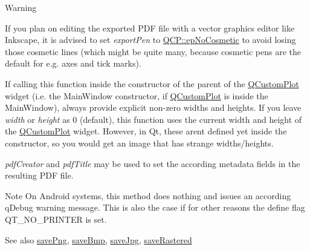 \begin{DoxyWarning}{Warning}
\begin{DoxyItemize}
\item If you plan on editing the exported P\+DF file with a vector graphics editor like Inkscape, it is advised to set {\itshape export\+Pen} to \hyperlink{namespace_q_c_p_a17844f19e1019693a953e1eb93536d2faec51f17ee42178094138e69ac73daa52}{Q\+C\+P\+::ep\+No\+Cosmetic} to avoid losing those cosmetic lines (which might be quite many, because cosmetic pens are the default for e.\+g. axes and tick marks). \item If calling this function inside the constructor of the parent of the \hyperlink{class_q_custom_plot}{Q\+Custom\+Plot} widget (i.\+e. the Main\+Window constructor, if \hyperlink{class_q_custom_plot}{Q\+Custom\+Plot} is inside the Main\+Window), always provide explicit non-\/zero widths and heights. If you leave {\itshape width} or {\itshape height} as 0 (default), this function uses the current width and height of the \hyperlink{class_q_custom_plot}{Q\+Custom\+Plot} widget. However, in Qt, these aren\textquotesingle{}t defined yet inside the constructor, so you would get an image that has strange widths/heights.\end{DoxyItemize}
{\itshape pdf\+Creator} and {\itshape pdf\+Title} may be used to set the according metadata fields in the resulting P\+DF file.
\end{DoxyWarning}
\begin{DoxyNote}{Note}
On Android systems, this method does nothing and issues an according q\+Debug warning message. This is also the case if for other reasons the define flag {\ttfamily Q\+T\+\_\+\+N\+O\+\_\+\+P\+R\+I\+N\+T\+ER} is set.
\end{DoxyNote}
\begin{DoxySeeAlso}{See also}
\hyperlink{class_q_custom_plot_ac92cc9256d12f354b40a4be4600b5fb9}{save\+Png}, \hyperlink{class_q_custom_plot_ae3a86ed0795670e50afa21759d4fa13d}{save\+Bmp}, \hyperlink{class_q_custom_plot_a76f0d278e630a711fa6f48048cfd83e4}{save\+Jpg}, \hyperlink{class_q_custom_plot_ad7723ce2edfa270632ef42b03a444352}{save\+Rastered} 
\end{DoxySeeAlso}
\mbox{\label{class_q_custom_plot_ac92cc9256d12f354b40a4be4600b5fb9}} 
